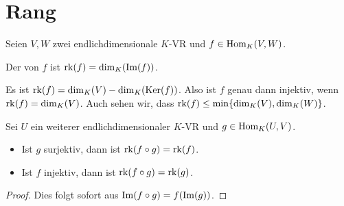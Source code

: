 \section{Rang}

Seien $V,W$ zwei endlichdimensionale $K$-VR und $f\in \operatorname{Hom}_K(V,W)$.

\begin{definition}[Rang]
	Der  von $f$ ist $\operatorname{rk}(f)=\dim_K(\operatorname{Im}(f))$.
\end{definition}

\begin{remark}
	Es ist $\operatorname{rk}(f)=\dim_K(V)-\dim_K(\operatorname{Ker}(f))$. Also ist $f$ genau dann injektiv, wenn $\operatorname{rk}(f)=\dim_K(V)$. Auch sehen wir, 
	dass $\operatorname{rk}(f)\le \min\{\dim_K(V),\dim_K(W)\}$.
\end{remark}

\begin{lemma}
	Sei $U$ ein weiterer endlichdimensionaler $K$-VR und $g\in \operatorname{Hom}_K(U,V)$.
	\begin{itemize}
		\item Ist $g$ surjektiv, dann ist $\operatorname{rk}(f\circ g)=\operatorname{rk}(f)$.
		\item Ist $f$ injektiv, dann ist $\operatorname{rk}(f\circ g)=\operatorname{rk}(g)$.
	\end{itemize}
\end{lemma}
\begin{proof}
	Dies folgt sofort aus $\operatorname{Im}(f\circ g)=f(\operatorname{Im}(g))$.
\end{proof}

